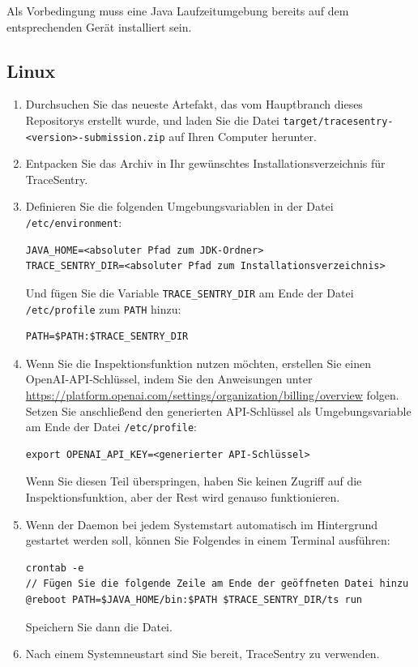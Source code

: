 \documentclass[a4paper,12pt]{report}
\begin{document}
    Als Vorbedingung muss eine Java Laufzeitumgebung bereits auf dem entsprechenden Gerät installiert sein.

    \subsection{Linux}
    \begin{enumerate}
        \item Durchsuchen Sie das neueste Artefakt, das vom Hauptbranch dieses Repositorys erstellt wurde, und laden Sie die Datei
        \texttt{target/tracesentry-\textless{}version\textgreater{}-submission.zip} auf Ihren Computer herunter.
        \item Entpacken Sie das Archiv in Ihr gewünschtes Installationsverzeichnis für TraceSentry.
        \item Definieren Sie die folgenden Umgebungsvariablen in der Datei \texttt{/etc/environment}:
        \begin{lstlisting}[label={lst:lstlisting-unix-1}]
JAVA_HOME=<absoluter Pfad zum JDK-Ordner>
TRACE_SENTRY_DIR=<absoluter Pfad zum Installationsverzeichnis>
        \end{lstlisting}
        Und fügen Sie die Variable \texttt{TRACE\_SENTRY\_DIR} am Ende der Datei \texttt{/etc/profile} zum \texttt{PATH} hinzu:
        \begin{lstlisting}[label={lst:lstlisting-unix-2}]
PATH=$PATH:$TRACE_SENTRY_DIR
        \end{lstlisting}
        \item Wenn Sie die Inspektionsfunktion nutzen möchten, erstellen Sie einen OpenAI-API-Schlüssel, indem Sie den Anweisungen unter \url{https://platform.openai.com/settings/organization/billing/overview} folgen.
        Setzen Sie anschließend den generierten API-Schlüssel als Umgebungsvariable am Ende der Datei \texttt{/etc/profile}:
        \begin{lstlisting}[label={lst:lstlisting-unix-3}]
export OPENAI_API_KEY=<generierter API-Schlüssel>
        \end{lstlisting}
        Wenn Sie diesen Teil überspringen, haben Sie keinen Zugriff auf die Inspektionsfunktion, aber der Rest wird genauso funktionieren.
        \item Wenn der Daemon bei jedem Systemstart automatisch im Hintergrund gestartet werden soll, können Sie Folgendes in einem Terminal ausführen:
        \begin{lstlisting}[label={lst:lstlisting-unix-4}]
crontab -e
// Fügen Sie die folgende Zeile am Ende der geöffneten Datei hinzu
@reboot PATH=$JAVA_HOME/bin:$PATH $TRACE_SENTRY_DIR/ts run
        \end{lstlisting}
        Speichern Sie dann die Datei.
        \item Nach einem Systemneustart sind Sie bereit, TraceSentry zu verwenden.
    \end{enumerate}
\end{document}
